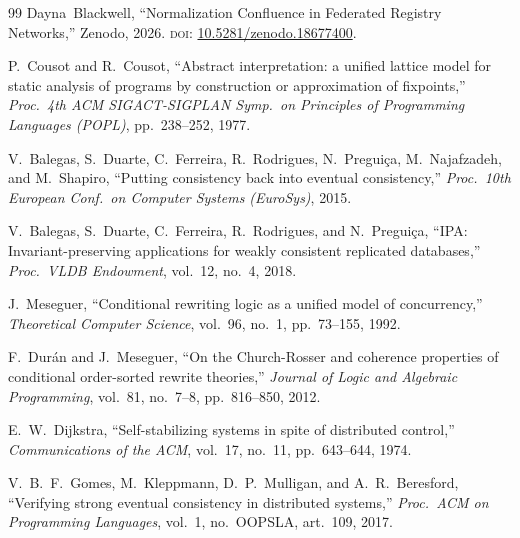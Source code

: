 \documentclass[11pt,a4paper]{article}
\theoremstyle{plain}
\theoremstyle{definition}
\theoremstyle{remark}
\begin{document}
\begin{thebibliography}{99}
Dayna~Blackwell,
``Normalization Confluence in Federated Registry Networks,''
Zenodo, 2026.
\textsc{doi}: \href{https://doi.org/10.5281/zenodo.18677400}{10.5281/zenodo.18677400}.

P.~Cousot and R.~Cousot,
``Abstract interpretation: a unified lattice model for static analysis of programs by construction or approximation of fixpoints,''
\emph{Proc.\ 4th ACM SIGACT-SIGPLAN Symp.\ on Principles of Programming Languages (POPL)}, pp.~238--252, 1977.

V.~Balegas, S.~Duarte, C.~Ferreira, R.~Rodrigues, N.~Pregui\c{c}a, M.~Najafzadeh, and M.~Shapiro,
``Putting consistency back into eventual consistency,''
\emph{Proc.\ 10th European Conf.\ on Computer Systems (EuroSys)}, 2015.

V.~Balegas, S.~Duarte, C.~Ferreira, R.~Rodrigues, and N.~Pregui\c{c}a,
``IPA: Invariant-preserving applications for weakly consistent replicated databases,''
\emph{Proc.\ VLDB Endowment}, vol.~12, no.~4, 2018.

J.~Meseguer,
``Conditional rewriting logic as a unified model of concurrency,''
\emph{Theoretical Computer Science}, vol.~96, no.~1, pp.~73--155, 1992.

F.~Dur\'an and J.~Meseguer,
``On the Church-Rosser and coherence properties of conditional order-sorted rewrite theories,''
\emph{Journal of Logic and Algebraic Programming}, vol.~81, no.~7--8, pp.~816--850, 2012.

E.~W.~Dijkstra,
``Self-stabilizing systems in spite of distributed control,''
\emph{Communications of the ACM}, vol.~17, no.~11, pp.~643--644, 1974.

V.~B.~F.~Gomes, M.~Kleppmann, D.~P.~Mulligan, and A.~R.~Beresford,
``Verifying strong eventual consistency in distributed systems,''
\emph{Proc.\ ACM on Programming Languages}, vol.~1, no.~OOPSLA, art.~109, 2017.

\end{thebibliography}
\end{document}
